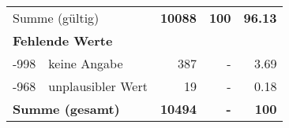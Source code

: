 \begin{longtable}{lXrrr}
     \midrule
     \multicolumn{2}{l}{Summe (gültig)} &
       \textbf{\num{10088}} &
     \textbf{100} &
       \textbf{\num[round-mode=places,round-precision=2]{96,13}} \\
     \multicolumn{5}{l}{\textbf{Fehlende Werte}}\\
       -998 &
       keine Angabe &
         \num{387} &
        - &
         \num[round-mode=places,round-precision=2]{3,69} \\
       -968 &
       unplausibler Wert &
         \num{19} &
        - &
         \num[round-mode=places,round-precision=2]{0,18} \\
     \midrule
     \multicolumn{2}{l}{\textbf{Summe (gesamt)}} &
          \textbf{\num{10494}} &
        \textbf{-} &
        \textbf{100} \\
     \bottomrule
     \end{longtable}
     
